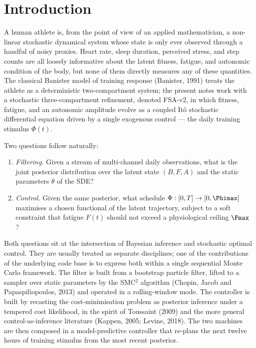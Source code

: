 \section{Introduction}\label{sec:intro}

A human athlete is, from the point of view of an applied mathematician,
a non-linear stochastic dynamical system whose state is only ever observed
through a handful of noisy proxies. Heart rate, sleep duration, perceived
stress, and step counts are all loosely informative about the latent
fitness, fatigue, and autonomic condition of the body, but none of them
directly measures any of these quantities. The classical Banister model of
training response (Banister, 1991) treats the athlete as a deterministic
two-compartment system; the present notes work with a stochastic
three-compartment refinement, denoted FSA-v2, in which fitness, fatigue,
and an autonomic amplitude evolve as a coupled It\^o stochastic differential
equation driven by a single exogenous control --- the daily training
stimulus $\Phi(t)$.

Two questions follow naturally:

\begin{enumerate}
  \item \emph{Filtering.} Given a stream of multi-channel daily
        observations, what is the joint posterior distribution over the
        latent state $(B,F,A)$ and the static parameters $\theta$ of the
        SDE?
  \item \emph{Control.} Given the same posterior, what schedule
        $\Phi:[0,T]\to[0,\Phimax]$ maximises a chosen functional of the
        latent trajectory, subject to a soft constraint that fatigue
        $F(t)$ should not exceed a physiological ceiling $\Fmax$?
\end{enumerate}

Both questions sit at the intersection of Bayesian inference and stochastic
optimal control. They are usually treated as separate disciplines; one of
the contributions of the underlying code base is to express both within a
single sequential Monte Carlo framework. The filter is built from a
bootstrap particle filter, lifted to a sampler over static parameters by
the SMC${}^2$ algorithm (Chopin, Jacob and Papaspiliopoulos, 2013) and
operated in a rolling-window mode. The controller is built by recasting
the cost-minimisation problem as posterior inference under a tempered cost
likelihood, in the spirit of Toussaint (2009) and the more general
control-as-inference literature (Kappen, 2005; Levine, 2018). The two
machines are then composed in a model-predictive controller that re-plans
the next twelve hours of training stimulus from the most recent posterior.

